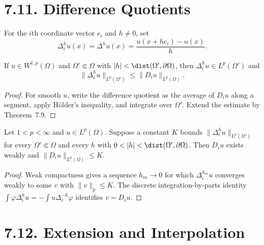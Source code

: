 \section*{7.11. Difference Quotients}

\begin{definition}
\label{gt:def-sobolev-difference-quotient}
For the $i$th coordinate vector $e_i$ and $h\neq0$, set
\begin{equation}
\tag{7.53}
\Delta_i^h u(x)=\Delta^h u(x)
=\frac{u(x+he_i)-u(x)}h.
\end{equation}
\end{definition}

\begin{lemma}
\label{gt:lem-sobolev-difference-quotient-bound}
If $u\in W^{1,p}(\Omega)$ and $\Omega'\Subset\Omega$ with
$|h|<\dist(\Omega',\partial\Omega)$, then
$\Delta_i^hu\in L^p(\Omega')$ and
\[
\|\Delta_i^hu\|_{L^p(\Omega')}\leq\|D_i u\|_{L^p(\Omega)}.
\]
\end{lemma}
\begin{proof}
\sketch For smooth $u$, write the difference quotient as the average of
$D_i u$ along a segment, apply H\"older's inequality, and integrate over $\Omega'$. Extend
the estimate by Theorem~7.9.
\end{proof}

\begin{lemma}
\label{gt:lem-sobolev-difference-quotient-criterion}
Let $1<p<\infty$ and $u\in L^p(\Omega)$. Suppose a constant $K$ bounds
$\|\Delta_i^hu\|_{L^p(\Omega')}$ for every $\Omega'\Subset\Omega$ and every
$h$ with $0<|h|<\dist(\Omega',\partial\Omega)$. Then $D_i u$ exists weakly
and $\|D_i u\|_{L^p(\Omega)}\leq K$.
\end{lemma}
\begin{proof}
\sketch Weak compactness gives a sequence $h_m\to0$ for which
$\Delta_i^{h_m}u$ converges weakly to some $v$ with $\|v\|_p\leq K$. The
discrete integration-by-parts identity
$\int\varphi\Delta_i^hu=-\int u\Delta_i^{-h}\varphi$ identifies
$v=D_i u$.
\end{proof}

\section*{7.12. Extension and Interpolation}


